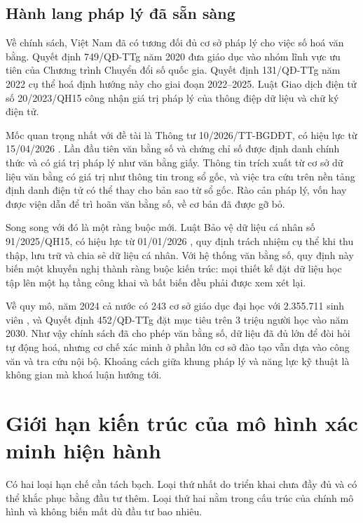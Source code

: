 \subsection{Hành lang pháp lý đã sẵn sàng}

Về chính sách, Việt Nam đã có tương đối đủ cơ sở pháp lý cho việc số hoá văn bằng. Quyết định 749/QĐ-TTg năm 2020 \cite{QD749_2020} đưa giáo dục vào nhóm lĩnh vực ưu tiên của Chương trình Chuyển đổi số quốc gia. Quyết định 131/QĐ-TTg năm 2022 \cite{QD131_2022} cụ thể hoá định hướng này cho giai đoạn 2022--2025. Luật Giao dịch điện tử số 20/2023/QH15 \cite{LuatGDDT2023} công nhận giá trị pháp lý của thông điệp dữ liệu và chữ ký điện tử.

Mốc quan trọng nhất với đề tài là Thông tư 10/2026/TT-BGDĐT, có hiệu lực từ 15/04/2026 \cite{TT10_2026}. Lần đầu tiên văn bằng số và chứng chỉ số được định danh chính thức và có giá trị pháp lý như văn bằng giấy. Thông tin trích xuất từ cơ sở dữ liệu văn bằng có giá trị như thông tin trong sổ gốc, và việc tra cứu trên nền tảng định danh điện tử có thể thay cho bản sao từ sổ gốc. Rào cản pháp lý, vốn hay được viện dẫn để trì hoãn văn bằng số, về cơ bản đã được gỡ bỏ.

Song song với đó là một ràng buộc mới. Luật Bảo vệ dữ liệu cá nhân số 91/2025/QH15, có hiệu lực từ 01/01/2026 \cite{LuatBVDLCN2025}, quy định trách nhiệm cụ thể khi thu thập, lưu trữ và chia sẻ dữ liệu cá nhân. Với hệ thống văn bằng số, quy định này biến một khuyến nghị thành ràng buộc kiến trúc: mọi thiết kế đặt dữ liệu học tập lên một hạ tầng công khai và bất biến đều phải được xem xét lại.

Về quy mô, năm 2024 cả nước có 243 cơ sở giáo dục đại học với 2.355.711 sinh viên \cite{MOET_Stats2025}, và Quyết định 452/QĐ-TTg \cite{QD452_2025} đặt mục tiêu trên 3 triệu người học vào năm 2030. Như vậy chính sách đã cho phép văn bằng số, dữ liệu đã đủ lớn để đòi hỏi tự động hoá, nhưng cơ chế xác minh ở phần lớn cơ sở đào tạo vẫn dựa vào công văn và tra cứu nội bộ. Khoảng cách giữa khung pháp lý và năng lực kỹ thuật là không gian mà khoá luận hướng tới.

\section{Giới hạn kiến trúc của mô hình xác minh hiện hành}
\label{sec:gioi-han-mo-hinh}

Có hai loại hạn chế cần tách bạch. Loại thứ nhất do triển khai chưa đầy đủ và có thể khắc phục bằng đầu tư thêm. Loại thứ hai nằm trong cấu trúc của chính mô hình và không biến mất dù đầu tư bao nhiêu.

